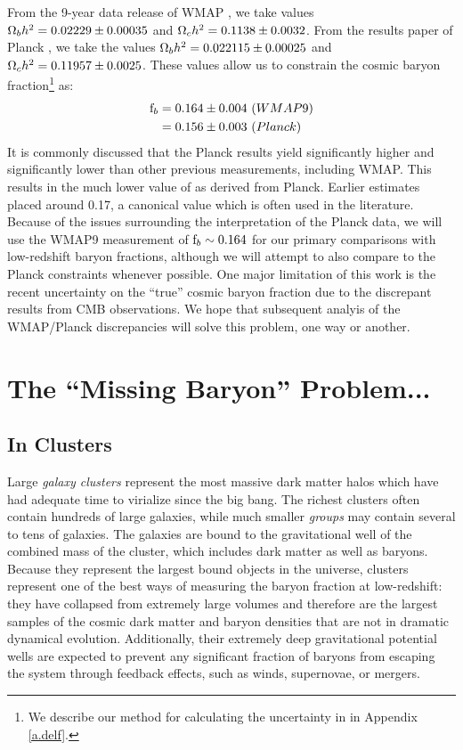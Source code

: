 From the 9-year data release of WMAP \citep[WMAP9,][]{Hinshaw2013}, we
take values $\Omega_b h^2 = 0.02229 \pm 0.00035$ and $\Omega_c h^2 =
0.1138 \pm 0.0032$. From the results paper of Planck
\citep{PlanckResultsXVI}, we take the values $\Omega_b h^2 = 0.022115
\pm 0.00025$ and $\Omega_c h^2 = 0.11957 \pm 0.0025$. These values
allow us to constrain the cosmic baryon fraction\footnote{We describe
  our method for calculating the uncertainty in \fb{} in Appendix
  \ref{a.delf}.} as:
\begin{align}
\textrm{f\ensuremath{_b}} &= 0.164 \pm 0.004 \,\,(WMAP9) \nonumber\\
&= 0.156 \pm 0.003 \,\,(Planck) \nonumber
\end{align}
It is commonly discussed  that the Planck
results yield \omegam{} significantly higher and \Ho{} significantly
lower than other previous measurements, including WMAP. This results
in the much lower value of \fb{} as derived from Planck. Earlier
estimates \citep[e.g.,WMAP5,][]{Dunkley2009} placed \fb{}
around 0.17, a canonical value which is often used in the
literature. Because of the issues surrounding the interpretation of
the Planck data, we will use the WMAP9 measurement of $\textrm{f\ensuremath{_b}}{}\sim0.164$
for our primary comparisons with low-redshift baryon fractions,
although we will attempt to also compare to the Planck constraints
whenever possible. One major limitation of this work is the recent
uncertainty on the ``true'' cosmic baryon fraction due to the
discrepant results from CMB observations. We hope that subsequent
analyis of the WMAP/Planck discrepancies will solve this problem, one
way or another.

\section{The ``Missing Baryon'' Problem...}
\label{s.Missing}
\subsection{In Clusters}
\label{s.Missing.Clusters}

Large \textit{galaxy clusters} represent the most massive dark matter
halos which have had adequate time to virialize since the big
bang. The richest clusters often contain hundreds of large galaxies,
while much smaller \textit{groups} may contain several to tens of
galaxies. The galaxies are bound to the gravitational well of the
combined mass of the cluster, which includes dark matter as well as
baryons. Because they represent the largest bound objects in the
universe, clusters represent one of the best ways of measuring the
baryon fraction at low-redshift: they have collapsed from extremely
large volumes and therefore are the largest samples of the cosmic dark
matter and baryon densities that are not in dramatic dynamical
evolution. Additionally, their extremely deep gravitational potential
wells are expected to prevent any significant fraction of baryons from
escaping the system through feedback effects, such as winds,
supernovae, or mergers.

